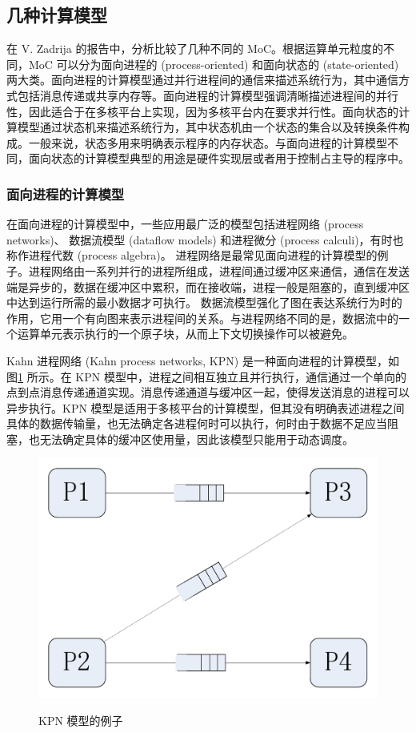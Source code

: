 \subsection{几种计算模型}

在 V. Zadrija 的报告中，分析比较了几种不同的 MoC。根据运算单元粒度的不同，MoC 可以分为面向进程的 (process-oriented) 和面向状态的 (state-oriented) 两大类。面向进程的计算模型通过并行进程间的通信来描述系统行为，其中通信方式包括消息传递或共享内存等。面向进程的计算模型强调清晰描述进程间的并行性，因此适合于在多核平台上实现，因为多核平台内在要求并行性。面向状态的计算模型通过状态机来描述系统行为，其中状态机由一个状态的集合以及转换条件构成。一般来说，状态多用来明确表示程序的内存状态。与面向进程的计算模型不同，面向状态的计算模型典型的用途是硬件实现层或者用于控制占主导的程序中。

\subsubsection{面向进程的计算模型}
在面向进程的计算模型中，一些应用最广泛的模型包括进程网络 (process networks)、 数据流模型 (dataflow models) 和进程微分 (process calculi)，有时也称作进程代数 (process algebra)。
进程网络是最常见面向进程的计算模型的例子。进程网络由一系列并行的进程所组成，进程间通过缓冲区来通信，通信在发送端是异步的，数据在缓冲区中累积，而在接收端，进程一般是阻塞的，直到缓冲区中达到运行所需的最小数据才可执行。
数据流模型强化了图在表达系统行为时的作用，它用一个有向图来表示进程间的关系。与进程网络不同的是，数据流中的一个运算单元表示执行的一个原子块，从而上下文切换操作可以被避免。


Kahn 进程网络 (Kahn process networks, KPN) 是一种面向进程的计算模型，如图\ref{basic-fig-KPN} 所示。在 KPN 模型中，进程之间相互独立且并行执行，通信通过一个单向的点到点消息传递通道实现。消息传递通道与缓冲区一起，使得发送消息的进程可以异步执行。KPN 模型是适用于多核平台的计算模型，但其没有明确表述进程之间具体的数据传输量，也无法确定各进程何时可以执行，何时由于数据不足应当阻塞，也无法确定具体的缓冲区使用量，因此该模型只能用于动态调度。

\begin{figure}[!bt]
  \centering
  \includegraphics[height=20ex]{figure/basic-KPN.pdf}\\
  \caption{KPN 模型的例子}\label{basic-fig-KPN}
\end{figure}

